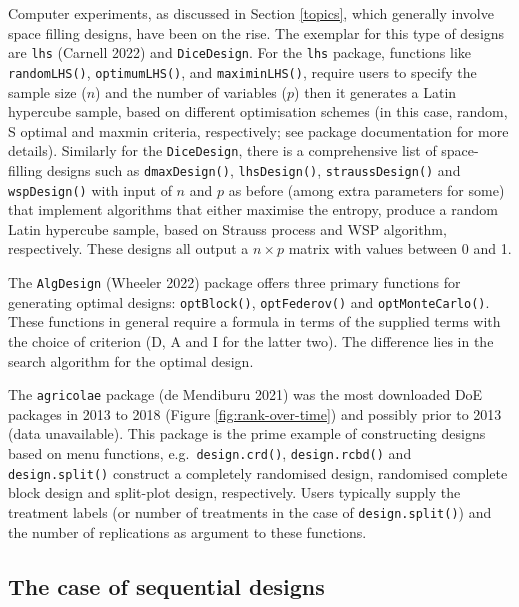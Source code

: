 \documentclass{article}
\begin{document}
Computer experiments, as discussed in Section \ref{topics}, which
generally involve space filling designs, have been on the rise. The
exemplar for this type of designs are \texttt{lhs} (Carnell 2022) and
\texttt{DiceDesign}. For the \texttt{lhs} package, functions like
\texttt{randomLHS()}, \texttt{optimumLHS()}, and \texttt{maximinLHS()},
require users to specify the sample size (\(n\)) and the number of
variables (\(p\)) then it generates a Latin hypercube sample, based on
different optimisation schemes (in this case, random, S optimal and
maxmin criteria, respectively; see package documentation for more
details). Similarly for the \texttt{DiceDesign}, there is a
comprehensive list of space-filling designs such as
\texttt{dmaxDesign()}, \texttt{lhsDesign()}, \texttt{straussDesign()}
and \texttt{wspDesign()} with input of \(n\) and \(p\) as before (among
extra parameters for some) that implement algorithms that either
maximise the entropy, produce a random Latin hypercube sample, based on
Strauss process and WSP algorithm, respectively. These designs all
output a \(n \times p\) matrix with values between 0 and 1.

The \texttt{AlgDesign} (Wheeler 2022) package offers three primary
functions for generating optimal designs: \texttt{optBlock()},
\texttt{optFederov()} and \texttt{optMonteCarlo()}. These functions in
general require a formula in terms of the supplied terms with the choice
of criterion (D, A and I for the latter two). The difference lies in the
search algorithm for the optimal design.

The \texttt{agricolae} package (de Mendiburu 2021) was the most
downloaded DoE packages in 2013 to 2018 (Figure
\ref{fig:rank-over-time}) and possibly prior to 2013 (data unavailable).
This package is the prime example of constructing designs based on menu
functions, e.g.~\texttt{design.crd()}, \texttt{design.rcbd()} and
\texttt{design.split()} construct a completely randomised design,
randomised complete block design and split-plot design, respectively.
Users typically supply the treatment labels (or number of treatments in
the case of \texttt{design.split()}) and the number of replications as
argument to these functions.

\hypertarget{the-case-of-sequential-designs}{%
\subsection{The case of sequential
designs}\label{the-case-of-sequential-designs}}
\end{document}
